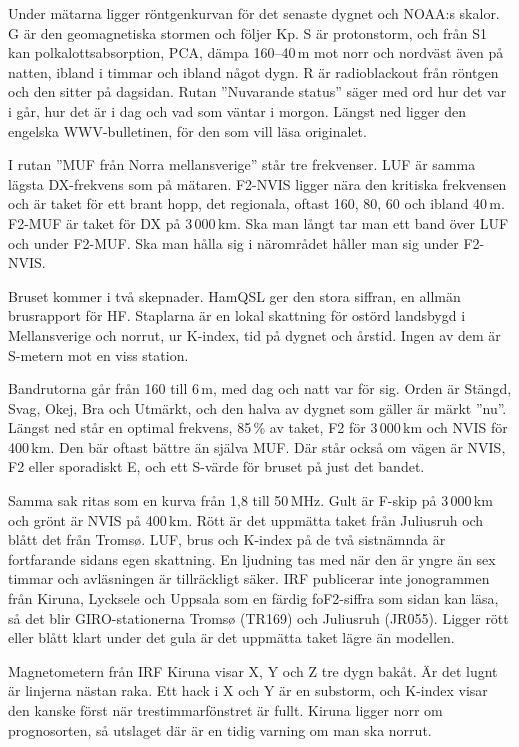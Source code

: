 Under mätarna ligger röntgenkurvan för det senaste dygnet och NOAA:s
skalor. G är den geomagnetiska stormen och följer Kp. S är protonstorm,
och från S1 kan polkalottsabsorption, PCA, dämpa 160--40\,m mot norr och
nordväst även på natten, ibland i timmar och ibland något dygn. R är
radioblackout från röntgen och den sitter på dagsidan. Rutan ''Nuvarande
status'' säger med ord hur det var i går, hur det är i dag och vad som
väntar i morgon. Längst ned ligger den engelska WWV-bulletinen, för den
som vill läsa originalet.

I rutan ''MUF från Norra mellansverige'' står tre frekvenser. LUF är samma
lägsta DX-frekvens som på mätaren. F2-NVIS ligger nära den kritiska
frekvensen och är taket för ett brant hopp, det regionala, oftast 160, 80,
60 och ibland 40\,m. F2-MUF är taket för DX på 3\,000\,km. Ska man långt
tar man ett band över LUF och under F2-MUF. Ska man hålla sig i
närområdet håller man sig under F2-NVIS.

Bruset kommer i två skepnader. HamQSL ger den stora siffran, en allmän
brusrapport för HF. Staplarna är en lokal skattning för ostörd landsbygd
i Mellansverige och norrut, ur K-index, tid på dygnet och årstid. Ingen
av dem är S-metern mot en viss station.

Bandrutorna går från 160 till 6\,m, med dag och natt var för sig. Orden är
Stängd, Svag, Okej, Bra och Utmärkt, och den halva av dygnet som gäller är
märkt ''nu''. Längst ned står en optimal frekvens, 85\,\% av taket, F2
för 3\,000\,km och NVIS för 400\,km. Den bär oftast bättre än själva MUF.
Där står också om vägen är NVIS, F2 eller sporadiskt E, och ett S-värde
för bruset på just det bandet.

Samma sak ritas som en kurva från 1,8 till 50\,MHz. Gult är F-skip på
3\,000\,km och grönt är NVIS på 400\,km. Rött är det uppmätta taket från
Juliusruh och blått det från Tromsø. LUF, brus och K-index på de två
sistnämnda är fortfarande sidans egen skattning. En ljudning tas med när
den är yngre än sex timmar och avläsningen är tillräckligt säker. IRF
publicerar inte jonogrammen från Kiruna, Lycksele och Uppsala som en
färdig foF2-siffra som sidan kan läsa, så det blir GIRO-stationerna
Tromsø (TR169) och Juliusruh (JR055). Ligger rött eller blått klart under
det gula är det uppmätta taket lägre än modellen.

Magnetometern från IRF Kiruna visar X, Y och Z tre dygn bakåt. Är det
lugnt är linjerna nästan raka. Ett hack i X och Y är en substorm, och
K-index visar den kanske först när trestimmarfönstret är fullt. Kiruna
ligger norr om prognosorten, så utslaget där är en tidig varning om man
ska norrut.

